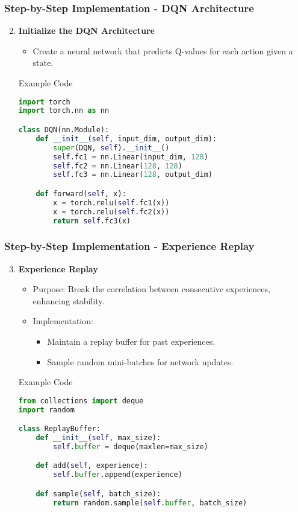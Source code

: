 \documentclass[aspectratio=169]{beamer}
\begin{document}
\begin{frame}[fragile]
    \frametitle{Step-by-Step Implementation - DQN Architecture}
    \begin{enumerate}
        \setcounter{enumi}{1}
        \item \textbf{Initialize the DQN Architecture}
        \begin{itemize}
            \item Create a neural network that predicts Q-values for each action given a state.
        \end{itemize}
        \begin{block}{Example Code}
        \begin{lstlisting}[language=Python]
import torch
import torch.nn as nn

class DQN(nn.Module):
    def __init__(self, input_dim, output_dim):
        super(DQN, self).__init__()
        self.fc1 = nn.Linear(input_dim, 128)
        self.fc2 = nn.Linear(128, 128)
        self.fc3 = nn.Linear(128, output_dim)

    def forward(self, x):
        x = torch.relu(self.fc1(x))
        x = torch.relu(self.fc2(x))
        return self.fc3(x)
        \end{lstlisting}
        \end{block}
    \end{enumerate}
\end{frame}

\begin{frame}[fragile]
    \frametitle{Step-by-Step Implementation - Experience Replay}
    \begin{enumerate}
        \setcounter{enumi}{2}
        \item \textbf{Experience Replay}
        \begin{itemize}
            \item Purpose: Break the correlation between consecutive experiences, enhancing stability.
            \item Implementation:
            \begin{itemize}
                \item Maintain a replay buffer for past experiences.
                \item Sample random mini-batches for network updates.
            \end{itemize}
        \end{itemize}
        \begin{block}{Example Code}
        \begin{lstlisting}[language=Python]
from collections import deque
import random

class ReplayBuffer:
    def __init__(self, max_size):
        self.buffer = deque(maxlen=max_size)

    def add(self, experience):
        self.buffer.append(experience)

    def sample(self, batch_size):
        return random.sample(self.buffer, batch_size)
        \end{lstlisting}
        \end{block}
    \end{enumerate}
\end{frame}
\end{document}

